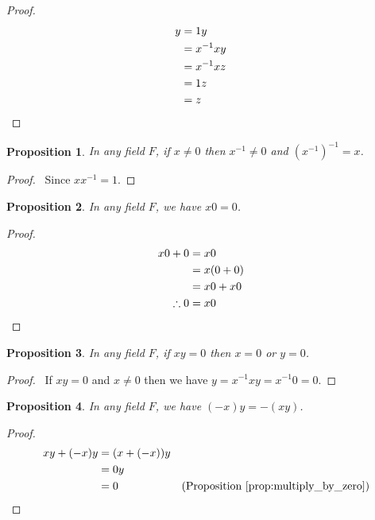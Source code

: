 \documentclass{book}
\let\qed\relax
\newtheorem{prop}{Proposition}[chapter]
\theoremstyle{definition}
\begin{document}
\begin{proof}
\pf
\begin{align*}
y & = 1y \\
& = x^{-1} x y \\
& = x^{-1} x z \\
& = 1z \\
& = z & \qed
\end{align*}
\end{proof}

\begin{prop}
In any field $F$, if $x \neq 0$ then $x^{-1} \neq 0$ and $(x^{-1})^{-1} = x$.
\end{prop}

\begin{proof}
\pf\ Since $x x^{-1} = 1$. \qed
\end{proof}

\begin{prop}
\label{prop:multiply_by_zero}
In any field $F$, we have $x0 = 0$.
\end{prop}

\begin{proof}
\pf
\begin{align*}
x0 + 0 & = x0 \\
& = x(0+0) \\
& = x0 + x0 \\
\therefore 0 & = x0 & \qed
\end{align*}
\end{proof}

\begin{prop}
In any field $F$, if $xy = 0$ then $x = 0$ or $y = 0$.
\end{prop}

\begin{proof}
\pf\ If $xy = 0$ and $x \neq 0$ then we have $y = x^{-1} x y = x^{-1} 0 = 0$. \qed
\end{proof}

\begin{prop}
In any field $F$, we have $(-x) y = -(xy)$.
\end{prop}

\begin{proof}
\pf
\begin{align*}
xy + (-x) y & = (x + (-x))y \\
& = 0y \\
& = 0 & (\text{Proposition \ref{prop:multiply_by_zero}}) \qed
\end{align*}
\end{proof}
\end{document}
